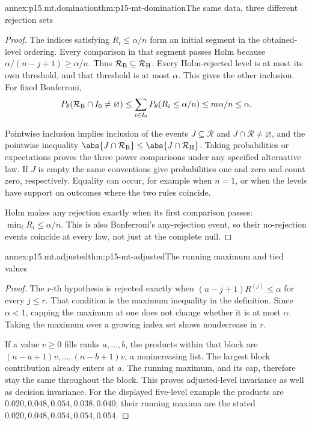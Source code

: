 \begin{annexitem}{annex:p15.mt.domination}{thm:p15-mt-domination}{The same data, three different rejection sets}
\begin{proof}
The indices satisfying \(R_i\leq\alpha/n\) form an initial segment in
the obtained-level ordering. Every comparison in that segment passes
Holm because \(\alpha/(n-j+1)\geq\alpha/n\). Thus
\(\mathcal R_{\rm B}\subseteq\mathcal R_{\rm H}\).
Every Holm-rejected level is at most its own threshold, and that
threshold is at most \(\alpha\). This gives the other inclusion.
For fixed Bonferroni,
\[
 P_\theta(\mathcal R_{\rm B}\cap I_0\ne\varnothing)
 \leq\sum_{i\in I_0}P_\theta(R_i\leq\alpha/n)
 \leq m\alpha/n\leq\alpha.
\]

Pointwise inclusion implies inclusion of the events \(J\subseteq\mathcal R\)
and \(J\cap\mathcal R\ne\varnothing\), and the pointwise inequality
\(\abs{J\cap\mathcal R_{\rm B}}\leq\abs{J\cap\mathcal R_{\rm H}}\).
Taking probabilities or expectations proves the three power comparisons
under any specified alternative law. If \(J\) is empty the same
conventions give probabilities one and zero and count zero, respectively.
Equality can occur, for example when \(n=1\), or when the levels have
support on outcomes where the two rules coincide.

Holm makes any rejection exactly when its first comparison passes:
\(\min_i R_i\leq\alpha/n\). This is also Bonferroni's any-rejection
event, so their no-rejection events coincide at every law, not just
at the complete null.
\end{proof}
\end{annexitem}

\begin{annexitem}{annex:p15.mt.adjusted}{thm:p15-mt-adjusted}{The running maximum and tied values}
\begin{proof}
The \(r\)-th hypothesis is rejected exactly when
\((n-j+1)R^{(j)}\leq\alpha\) for every \(j\leq r\).
That condition is the maximum inequality in the definition.
Since \(\alpha<1\), capping the maximum at one does not change whether
it is at most \(\alpha\). Taking the maximum over a growing index set
shows nondecrease in \(r\).

If a value \(v\geq0\) fills ranks \(a,\ldots,b\), the products within
that block are \((n-a+1)v,\ldots,(n-b+1)v\), a nonincreasing list.
The largest block contribution already enters at \(a\). The running
maximum, and its cap, therefore stay the same throughout the block.
This proves adjusted-level invariance as well as decision invariance.
For the displayed five-level example the products are
\(0.020,0.048,0.054,0.038,0.040\); their running maxima are the stated
\(0.020,0.048,0.054,0.054,0.054\).
\end{proof}
\end{annexitem}

